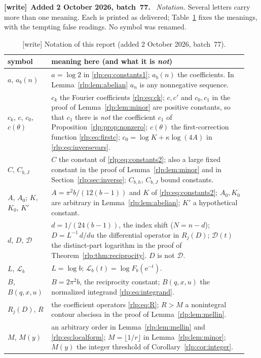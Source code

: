 \documentclass[11pt,letterpaper]{article}
\numberwithin{equation}{section}
\theoremstyle{remark}\newtheorem{remark}[theorem]{Remark}
\newcommand{\ee}{\mathrm e}
\newenvironment{writenote}[1][]{\par\smallskip\begingroup\small
 \noindent\textbf{[write]}\if\relax\detokenize{#1}\relax\else~\textbf{#1.}\fi\ }%
 {\par\endgroup\smallskip}
\begin{document}
\begin{writenote}[Added 2 October 2026, batch~77]
\emph{Notation.} Several letters carry more than one meaning. Each is
printed as delivered; Table~\ref{rlp:tab:notation} fixes the meanings, with
the tempting false readings. No symbol was renamed.
\begin{table}[tbp]\centering\footnotesize
\caption{[write] Notation of this report (added 2 October 2026, batch~77).}\label{rlp:tab:notation}
\begin{tabular}{@{}p{0.15\linewidth}p{0.79\linewidth}@{}}
\toprule
symbol & meaning here (and what it is \emph{not})\\
\midrule
$a$, $a_b(n)$ & $a=\log2$ in \eqref{rlp:eq:constants1}; $a_b(n)$ the coefficients. In Lemma~\ref{rlp:lem:abelian} $a_n$ is any nonnegative sequence.\\
$c_k$, $c$, $c_0$, $c(\theta)$ & $c_k$ the Fourier coefficients \eqref{rlp:eq:ck}; $c,c'$ and $c_0,c_1$ in the proof of Lemma~\ref{rlp:lem:minor} are positive constants, so that $c_1$ there is \emph{not} the coefficient $c_1$ of Proposition~\ref{rlp:prop:nonzero}; $c(\theta)$ the first-correction function \eqref{rlp:eq:firstc}; $c_0=\log K+\kappa\log(4A)$ in \eqref{rlp:eq:inversevars}.\\
$C$, $C_{b,J}$ & $C$ the constant of \eqref{rlp:eq:constants2}; also a large fixed constant in the proof of Lemma~\ref{rlp:lem:minor} and in Section~\ref{rlp:sec:inverse}; $C_{b,h}$, $C_{b,J}$ bound constants.\\
$A$, $A_0$; $K$, $K_0$, $K'$ & $A=\pi^2b/(12(b-1))$ and $K$ of \eqref{rlp:eq:constants2}; $A_0,K_0$ are arbitrary in Lemma~\ref{rlp:lem:abelian}; $K'$ a hypothetical constant.\\
$d$, $D$, $\mathcal D$ & $d=1/(24(b-1))$, the index shift ($N=n-d$); $D=L^{-1}\,d/du$ the differential operator in $R_j(D)$; $\mathcal D(t)$ the distinct-part logarithm in the proof of Theorem~\ref{rlp:thm:reciprocity}. $D$ is not $\mathcal D$.\\
$L$, $\mathcal L_b$ & $L=\log b$; $\mathcal L_b(t)=\log F_b(\ee^{-t})$.\\
$B$, $B(q,x,u)$ & $B=2\pi^2b$, the reciprocity constant; $B(q,x,u)$ the normalized integrand \eqref{rlp:eq:integrand}.\\
$R_j(D)$, $R$ & the coefficient operators \eqref{rlp:eq:R}; $R>M$ a nonintegral contour abscissa in the proof of Lemma~\ref{rlp:lem:mellin}.\\
$M$, $M(y)$ & an arbitrary order in Lemma~\ref{rlp:lem:mellin} and \eqref{rlp:eq:localform}; $M=\lfloor1/r\rfloor$ in Lemma~\ref{rlp:lem:minor}; $M(y)$ the integer threshold of Corollary~\ref{rlp:cor:integer}.\\

\end{tabular}
\end{table}
\end{writenote}
\end{document}
